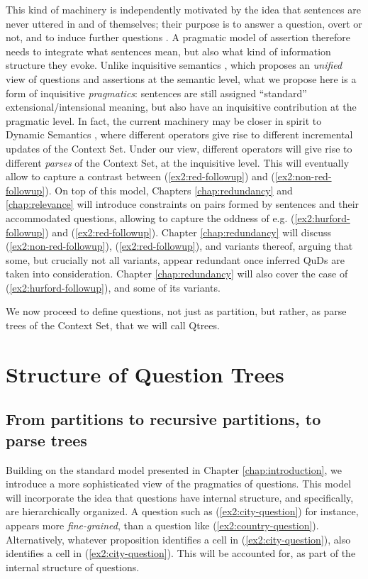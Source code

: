 This kind of machinery is independently motivated by the idea that sentences are never uttered in and of themselves; their purpose is to answer a question, overt or not, and to induce further questions \cite{Roberts1996}. A pragmatic model of assertion therefore needs to integrate what sentences mean, but also what kind of information structure they evoke. Unlike inquisitive semantics \citep{Mascarenhas2008,Ciardelli2009,Groenendijk2009,Ciardelli2018}, which proposes an \textit{unified} view of questions and assertions at the semantic level, what we propose here is a form of inquisitive \textit{pragmatics}: sentences are still assigned ``standard'' extensional/intensional meaning, but also have an inquisitive contribution at the pragmatic level. In fact, the current machinery may be closer in spirit to Dynamic Semantics \citep{Heim1983a,Heim1983b}, where different operators give rise to different incremental updates of the Context Set. Under our view, different operators will give rise to different \textit{parses} of the Context Set, at the inquisitive level. This will eventually allow to capture a contrast between (\ref{ex2:red-followup}) and (\ref{ex2:non-red-followup}). On top of this model, Chapters \ref{chap:redundancy} and \ref{chap:relevance} will introduce constraints on pairs formed by sentences and their accommodated questions, allowing to capture the oddness of e.g. (\ref{ex2:hurford-followup}) and (\ref{ex2:red-followup}). Chapter \ref{chap:redundancy} will discuss (\ref{ex2:non-red-followup}), (\ref{ex2:red-followup}), and variants thereof, arguing that some, but crucially not all variants, appear redundant once inferred QuDs are taken into consideration. Chapter \ref{chap:redundancy} will also cover the case of (\ref{ex2:hurford-followup}), and some of its variants.

We now proceed to define questions, not just as partition, but rather, as parse trees of the Context Set, that we will call Qtrees.

\section{Structure of Question Trees}

\subsection{From partitions to recursive partitions, to parse trees}
Building on the standard model presented in Chapter \ref{chap:introduction}, we introduce a more sophisticated view of the pragmatics of questions. This model will incorporate the idea that questions have internal structure, and specifically, are hierarchically organized. A question such as (\ref{ex2:city-question}) for instance, appears more \textit{fine-grained}, than a question like (\ref{ex2:country-question}). Alternatively, whatever proposition identifies a cell in (\ref{ex2:city-question}), also identifies a cell in (\ref{ex2:city-question}). This will be accounted for, as part of the internal structure of questions.

